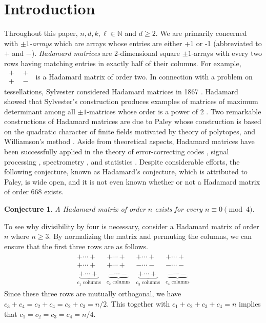 \documentclass[11pt,oneside]{amsart}
\newtheorem{conjecture}[theorem]{Conjecture}
\begin{document}
\section{Introduction}
Throughout this paper, $n,d,k,\ell\in \mathbb N$ and $d\geq 2$. We are primarily concerned with {\it $\pm 1$-arrays} which are arrays whose entries are either +1 or -1 (abbreviated to $+$ and $-$).   
{\it Hadamard matrices} are 2-dimensional square $\pm 1$-arrays with every two rows having matching entries in exactly half of their columns. For example, $\begin{tabular}{ c c }
 + & +  \\ 
 + & \textminus     
\end{tabular}$ is a Hadamard matrix of order two.  In connection with  a problem on tessellations, Sylvester considered Hadamard matrices in 1867  \cite{Sylv1867}.  Hadamard showed that Sylvester's construction produces examples of matrices of maximum determinant among all  $\pm 1$-matrices whose order is a power of 2 \cite{Hadam1893}. Two remarkable constructions of Hadamard matrices are due to Paley  \cite{Paley1933} whose construction is based on the quadratic character of finite fields motivated by theory of polytopes, and Williamson's method \cite{MR9590}. 
Aside from theoretical aspects, Hadamard matrices have been successfully applied in the theory of error-correcting codes \cite[Chapter 18]{MR1871828}, signal processing \cite{SignHadApp}, spectrometry \cite{HadamSpect}, and statistics \cite{MR523759}. Despite considerable efforts, the following conjecture, known as Hadamard's conjecture, which is attributed to Paley, is wide open, and it is not even known whether or not a Hadamard matrix of order 668 exists. 
\begin{conjecture}
A Hadamard matrix of order $n$  exists for every $n\equiv 0 \pmod 4$. 
\end{conjecture}

To see why divisibility by four is necessary, consider a Hadamard matrix of order $n$ where $n\geq 3$. By normalizing the matrix and permuting the columns, we can ensure that the first three rows are as follows.
\begin{align*}
\begin{array}{lccccc}
&+ \cdots + & + \cdots + & + \cdots + & + \cdots + &\\
&+ \cdots + & + \cdots + & - \cdots - & - \cdots - &\\
&
\underbrace{+ \cdots +}_{c_1 \text{ columns}} &
\underbrace{- \cdots -}_{c_2 \text{ columns}} &
\underbrace{+ \cdots +}_{c_3 \text{ columns}} &
\underbrace{- \cdots -}_{c_4 \text{ columns}}&
\end{array}
\end{align*}
Since these three rows are mutually orthogonal, we have $c_3+c_4=c_2+c_4=c_2+c_3=n/2$. This together with $c_1+c_2+c_3+c_4=n$ implies that $c_1=c_2=c_3=c_4=n/4$. 
\end{document}
